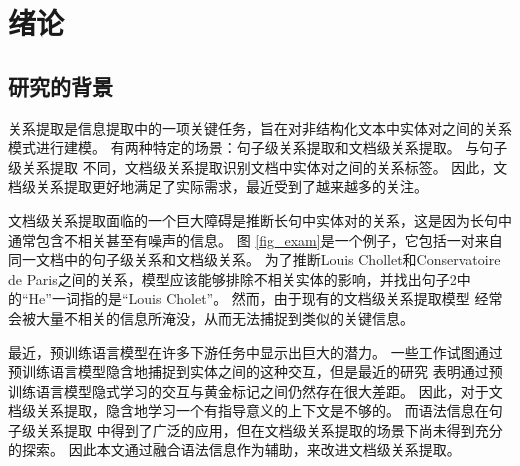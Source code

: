 \documentclass[bachelor]{thesis-uestc}
\begin{document}
\thesistableofcontents

\chapter{绪\hspace{6pt}论}

\section{研究的背景}
\begin{comment}
    课题背景，研究现状, 理论依据，实验基础，发展趋势以及本课题的理论意义
\end{comment}






关系提取是信息提取中的一项关键任务，旨在对非结构化文本中实体对之间的关系模式进行建模。
有两种特定的场景：句子级关系提取和文档级关系提取。
与句子级关系提取 \cite{sentenceRE-Dixit, sentenceRE-Lyu} 不同，文档级关系提取识别文档中实体对之间的关系标签。
因此，文档级关系提取更好地满足了实际需求，最近受到了越来越多的关注。\par

文档级关系提取面临的一个巨大障碍是推断长句中实体对的关系，这是因为长句中通常包含不相关甚至有噪声的信息。
图 \ref{fig_exam}是一个例子，它包括一对来自同一文档中的句子级关系和文档级关系。
为了推断Louis Chollet和Conservatoire de Paris之间的关系，模型应该能够排除不相关实体的影响，并找出句子2中的“He”一词指的是“Louis Cholet”。
然而，由于现有的文档级关系提取模型 \cite{bai-etal-2021-syntax} 经常会被大量不相关的信息所淹没，从而无法捕捉到类似的关键信息。 \par


最近，预训练语言模型在许多下游任务中显示出巨大的潜力。
一些工作\cite{ye-etal-2020-co-ferential, zhou2021document}试图通过预训练语言模型隐含地捕捉到实体之间的这种交互，但是最近的研究 \cite{sundaraman2019syntax, bai-etal-2021-syntax, liu2023document} 表明通过预训练语言模型隐式学习的交互与黄金标记之间仍然存在很大差距。
因此，对于文档级关系提取，隐含地学习一个有指导意义的上下文是不够的。
而语法信息在句子级关系提取 \cite{xu-etal-2016-improved, qin-etal-2021-relation} 中得到了广泛的应用，但在文档级关系提取的场景下尚未得到充分的探索。
因此本文通过融合语法信息作为辅助，来改进文档级关系提取。\par
\end{document}

